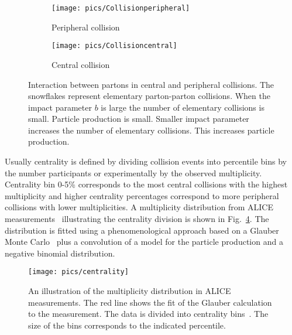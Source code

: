 \begin{figure}[h!]
\centering
        \begin{subfigure}[b]{0.45\textwidth}
                \centering
            	\texttt{[image: pics/Collisionperipheral]}
                \caption{Peripheral collision}
                \label{fig:peripheral}
        \end{subfigure}
        \begin{subfigure}[b]{0.45\textwidth}
                \centering
               \texttt{[image: pics/Collisioncentral]}
                \caption{Central collision}
                \label{fig:central}
        \end{subfigure}
        \caption[Interaction between partons in central and peripheral collisions.]{Interaction between partons in central and peripheral collisions. The snowflakes represent elementary parton-parton collisions. When the impact parameter $b$ is large the number of elementary collisions is small. Particle production is small. Smaller impact parameter increases the number of elementary collisions. This increases  particle production.}\label{fig:collisionA}
\end{figure}

Usually centrality is defined by dividing collision events into percentile bins by the number participants or experimentally by the observed multiplicity. Centrality bin 0-5\% corresponds to the most central collisions with the highest multiplicity and higher centrality percentages correspond to more peripheral collisions with lower multiplicities. A multiplicity distribution from ALICE measurements~\cite{PhysRevC.88.044909} illustrating the centrality division is shown in Fig.~\ref{fig:centrality}. The distribution is fitted using a phenomenological approach based on a Glauber Monte Carlo~\cite{Miller:2007ri} plus a convolution of a model for the particle production and a negative binomial distribution. 


\begin{figure}[htb]
\centering

               \texttt{[image: pics/centrality]}
        \caption[An illustration of the multiplicity distribution in ALICE measurement with centrality classes.]{An illustration of the multiplicity distribution in ALICE measurements. The red line shows
the fit of the Glauber calculation to the measurement. The data is divided into centrality bins~\cite{PhysRevC.88.044909}. The size of the bins corresponds to the indicated percentile.}
        	\label{fig:centrality}
\end{figure}

